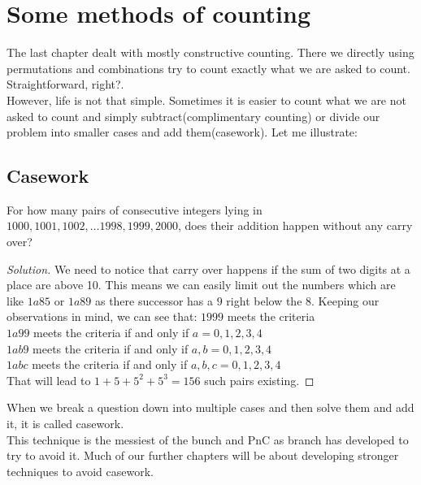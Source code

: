 \chapter{Some methods of counting}
The last chapter dealt with mostly constructive counting. There we directly using permutations and combinations try to count exactly what we are asked to count. Straightforward, right?.\\
However, life is not that simple. Sometimes it is easier to count what we are not asked to count and simply subtract(complimentary counting) or divide our problem into smaller cases and add them(casework). Let me illustrate:
\section{Casework}
\begin{example}
    For how many pairs of consecutive integers lying in {$1000, 1001, 1002, \dots 1998, 1999, 2000$}, does their addition happen without any carry over?
\end{example}
\begin{proof}
    [Solution]
We need to notice that carry over happens if the sum of two digits at a place are above 10. This means we can easily limit out the numbers which are like $1a85$ or $1a89$ as there successor has a $9$ right below the $8$.  
    Keeping our observations in mind, we can see that: 
    $1999$ meets the criteria\\
    $1a99$ meets the criteria if and only if $a=0,1,2,3,4$\\
    $1ab9$ meets the criteria if and only if $a,b=0,1,2,3,4$\\
    $1abc$ meets the criteria if and only if $a,b,c=0,1,2,3,4$\\
    That will lead to $1+5+5^2+5^3=156$ such pairs existing.
\end{proof}
When we break a question down into multiple cases and then solve them and add it, it is called casework.\\
This technique is the messiest of the bunch and PnC as branch has developed to try to avoid it. Much of our further chapters will be about developing stronger techniques to avoid casework.
